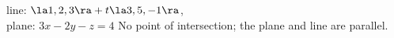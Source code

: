 {line: $\la 1,2,3\ra + t\la 3,5,-1\ra$,\\
plane: $3x-2y-z=4$
}
{No point of intersection; the plane and line are parallel.
}


